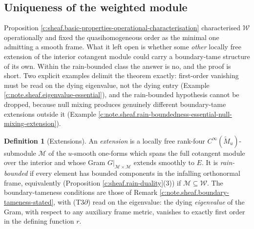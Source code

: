 \documentclass[11pt]{article}
\theoremstyle{definition}
\newtheorem{definition}[theorem]{Definition}
\theoremstyle{plain}
\providecommand{\Mt}{}\renewcommand{\Mt}{\widetilde{M}}
\providecommand{\shW}{}\renewcommand{\shW}{\mathcal{W}}
\begin{document}
\subsection*{Uniqueness of the weighted module}
\label{c:note.sheaf.setting-uniqueness-weighted-module}
Proposition \ref{c:sheaf.basic-properties-operational-characterisation} characterised $\shW$ operationally and fixed the quasihomogeneous order as the minimal one admitting a smooth frame. What it left open is whether some \emph{other} locally free extension of the interior cotangent module could carry a boundary-tame structure of its own. Within the rain-bounded class the answer is no, and the proof is short. Two explicit examples delimit the theorem exactly: first-order vanishing must be read on the dying eigenvalue, not the dying entry (Example \ref{c:note.sheaf.eigenvalue-essential}), and the rain-bounded hypothesis cannot be dropped, because null mixing produces genuinely different boundary-tame extensions outside it (Example \ref{c:note.sheaf.rain-boundedness-essential-null-mixing-extension}).

\begin{definition}[Extensions]\label{c:obj.sheaf.extensions}
An \emph{extension} is a locally free rank-four $C^\infty(\Mt_u)$-submodule $\mathcal{M}$ of the $u$-smooth one-forms which spans the full cotangent module over the interior and whose Gram $G|_{\mathcal{M}\times\mathcal{M}}$ extends smoothly to $E$. It is \emph{rain-bounded} if every element has bounded components in the infalling orthonormal frame, equivalently (Proposition \ref{c:sheaf.rain-duality}(3)) if $\mathcal{M} \subseteq \shW$. The boundary-tameness conditions are those of Remark \ref{c:note.sheaf.boundary-tameness-stated}, with (T3$\partial$) read on the eigenvalue: the dying \emph{eigenvalue} of the Gram, with respect to any auxiliary frame metric, vanishes to exactly first order in the defining function $r$.
\end{definition}
\end{document}
